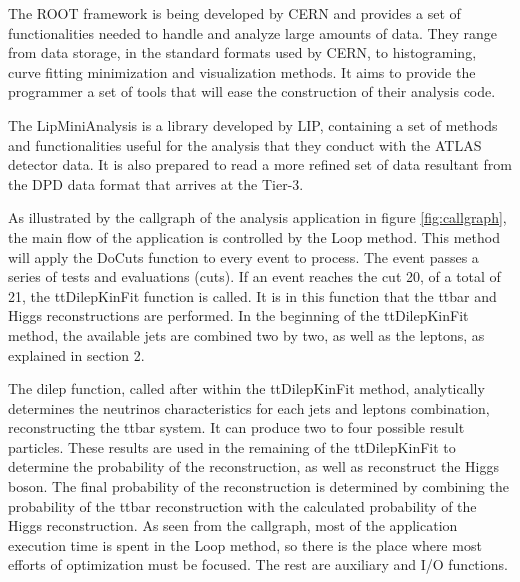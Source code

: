 The ROOT framework is being developed by CERN and provides a set of functionalities needed to handle and analyze large amounts of data. They range from data storage, in the standard formats used by CERN, to histograming, curve fitting minimization and visualization methods. It aims to provide the programmer a set of tools that will ease the construction of their analysis code.

The LipMiniAnalysis is a library developed by LIP, containing a set of methods and functionalities useful for the analysis that they conduct with the ATLAS detector data. It is also prepared to read a more refined set of data resultant from the DPD data format that arrives at the Tier-3.

As illustrated by the callgraph of the analysis application in figure \ref{fig:callgraph}, the main flow of the application is controlled by the Loop method. This method will apply the DoCuts function to every event to process. The event passes a series of tests and evaluations (cuts). If an event reaches the cut 20, of a total of 21, the ttDilepKinFit function is called. It is in this function that the ttbar and Higgs reconstructions are performed. In the beginning of the ttDilepKinFit method, the available jets are combined two by two, as well as the leptons, as explained in section 2.

The dilep function, called after within the ttDilepKinFit method, analytically determines the neutrinos characteristics for each jets and leptons combination, reconstructing the ttbar system. It can produce two to four possible result particles. These results are used in the remaining of the ttDilepKinFit to determine the probability of the reconstruction, as well as reconstruct the Higgs boson. The final probability of the reconstruction is determined by combining the probability of the ttbar reconstruction with the calculated probability of the Higgs reconstruction.
As seen from the callgraph, most of the application execution time is spent in the Loop method, so there is the place where most efforts of optimization must be focused. The rest are auxiliary and I/O functions.

\newpage
